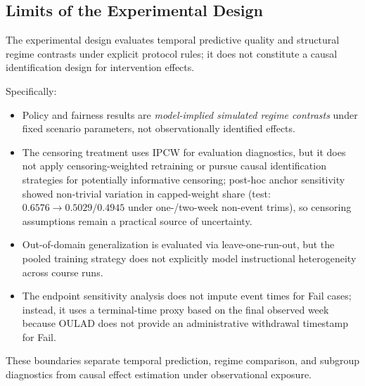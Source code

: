 \subsection{Limits of the Experimental Design}
\label{subsec:design_limits}

The experimental design evaluates temporal predictive quality and structural regime contrasts under explicit protocol rules; it does not constitute a causal identification design for intervention effects.

Specifically:
\begin{itemize}
\item Policy and fairness results are \textit{model-implied simulated regime contrasts} under fixed scenario parameters, not observationally identified effects.
\item The censoring treatment uses IPCW for evaluation diagnostics, but it does not apply censoring-weighted retraining or pursue causal identification strategies for potentially informative censoring; post-hoc anchor sensitivity showed non-trivial variation in capped-weight share (test: $0.6576 \rightarrow 0.5029/0.4945$ under one-/two-week non-event trims), so censoring assumptions remain a practical source of uncertainty.
\item Out-of-domain generalization is evaluated via leave-one-run-out, but the pooled training strategy does not explicitly model instructional heterogeneity across course runs.
\item The endpoint sensitivity analysis does not impute event times for Fail cases; instead, it uses a terminal-time proxy based on the final observed week because OULAD does not provide an administrative withdrawal timestamp for Fail.
\end{itemize}

These boundaries separate temporal prediction, regime comparison, and subgroup diagnostics from causal effect estimation under observational exposure.